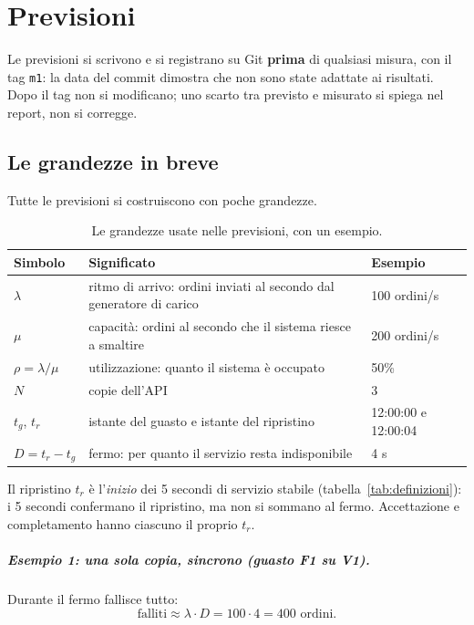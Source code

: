 \chapter{Previsioni}
\label{cap:previsioni}

Le previsioni si scrivono e si registrano su Git \textbf{prima} di qualsiasi misura, con il tag \texttt{m1}: la data del commit dimostra che non sono state adattate ai risultati. Dopo il tag non si modificano; uno scarto tra previsto e misurato si spiega nel report, non si corregge.

\section{Le grandezze in breve}
\label{sec:grandezze}

Tutte le previsioni si costruiscono con poche grandezze.

\begin{table}[htbp]
\centering
\caption{Le grandezze usate nelle previsioni, con un esempio.}
\label{tab:grandezze}
\begin{tabularx}{\linewidth}{@{}lLl@{}}
\toprule
\textbf{Simbolo} & \textbf{Significato} & \textbf{Esempio} \\
\midrule
$\lambda$ & ritmo di arrivo: ordini inviati al secondo dal generatore di carico & 100 ordini/s \\
$\mu$ & capacità: ordini al secondo che il sistema riesce a smaltire & 200 ordini/s \\
$\rho = \lambda / \mu$ & utilizzazione: quanto il sistema è occupato & 50\% \\
$N$ & copie dell'API & 3 \\
$t_g$, $t_r$ & istante del guasto e istante del ripristino & 12:00:00 e 12:00:04 \\
$D = t_r - t_g$ & fermo: per quanto il servizio resta indisponibile & 4 s \\
\bottomrule
\end{tabularx}
\end{table}

Il ripristino $t_r$ è l'\emph{inizio} dei 5 secondi di servizio stabile (tabella~\ref{tab:definizioni}): i 5 secondi confermano il ripristino, ma non si sommano al fermo. Accettazione e completamento hanno ciascuno il proprio $t_r$.

\paragraph{Esempio 1: una sola copia, sincrono (guasto F1 su V1).} Durante il fermo fallisce tutto:
\[
\text{falliti} \approx \lambda \cdot D = 100 \cdot 4 = 400 \text{ ordini.}
\]


